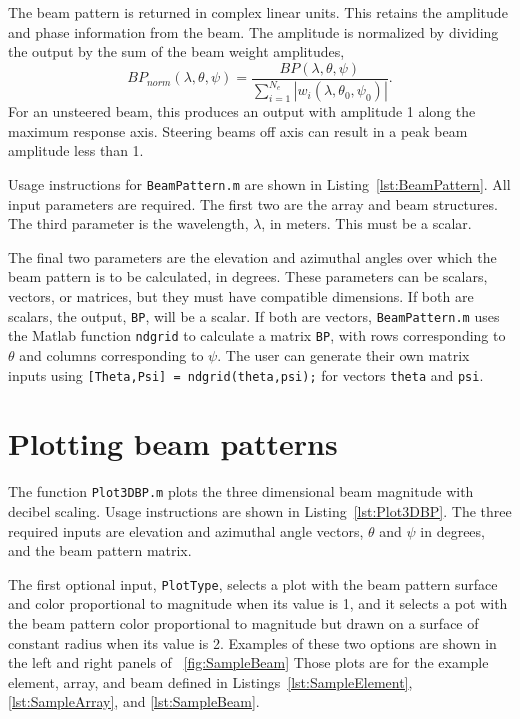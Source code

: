 The beam pattern is returned in complex linear units. This retains the amplitude and phase information from the beam. The amplitude is normalized by dividing the output by the sum of the beam weight amplitudes,
\begin{equation}
BP_{norm}(\lambda,\theta,\psi) = \frac{BP(\lambda,\theta,\psi)}{\sum_{i=1}^{N_e}|w_i(\lambda,\theta_0,\psi_0)|}.
\end{equation}
For an unsteered beam, this produces an output with amplitude 1 along the maximum response axis. Steering beams off axis can result in a peak beam amplitude less than 1.

Usage instructions for \texttt{BeamPattern.m} are shown in Listing~\ref{lst:BeamPattern}. All input parameters are required. The first two are the array and beam structures. The third parameter is the wavelength, $\lambda$, in meters. This must be a scalar. 

The final two parameters are the elevation and azimuthal angles over which the beam pattern is to be calculated, in degrees. These parameters can be scalars, vectors, or matrices, but they must have compatible dimensions. If both are scalars, the output, \texttt{BP}, will be a scalar. If both are vectors, \texttt{BeamPattern.m} uses the Matlab function \texttt{ndgrid} to calculate a matrix \texttt{BP}, with rows corresponding to $\theta$ and columns corresponding to $\psi$. The user can generate their own matrix inputs using \texttt{[Theta,Psi] = ndgrid(theta,psi);} for vectors \texttt{theta} and \texttt{psi}.



\section{Plotting beam patterns}

The function \texttt{Plot3DBP.m} plots the three dimensional beam magnitude with decibel scaling. Usage instructions are shown in Listing~\ref{lst:Plot3DBP}. The three required inputs are elevation and azimuthal angle vectors, $\theta$ and $\psi$ in degrees, and the beam pattern matrix. 

The first optional input, \texttt{PlotType}, selects a plot with the beam pattern surface and color proportional to magnitude when its value is 1, and it selects a pot with the beam pattern color proportional to magnitude but drawn on a surface of constant radius when its value is 2. Examples of these two options are shown in the left and right panels of \figname~\ref{fig:SampleBeam} Those plots are for the example element, array, and beam defined in Listings~\ref{lst:SampleElement}, \ref{lst:SampleArray}, and \ref{lst:SampleBeam}.

